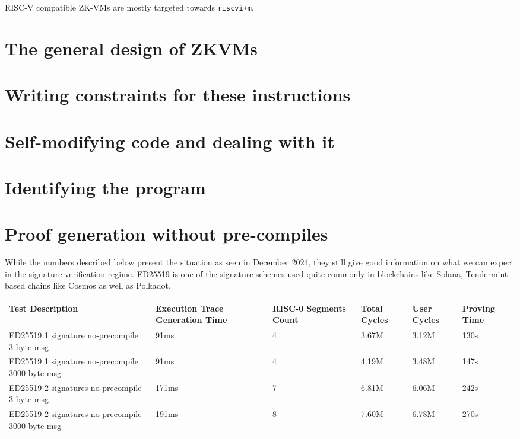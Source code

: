 RISC-V compatible ZK-VMs are mostly targeted towards \texttt{riscvi+m}.

\section{The general design of ZKVMs}

\section{Writing constraints for these instructions}

\section{Self-modifying code and dealing with it}

\section{Identifying the program}

\section{Proof generation without pre-compiles}
While the numbers described below present the situation as seen in December 2024, they still give good information on what we can expect in the signature verification regime. ED25519 is one of the signature schemes used quite commonly in blockchains like Solana, Tendermint-based chains like Cosmos as well as Polkadot.

\begin{center}
\begin{tabular}{ | m{14em} | m{5em}| m{5em} |m{5em} |m{5em} |m{4em} | } 
  \hline
  \textbf{Test Description} & \textbf{Execution Trace Generation Time} & \textbf{RISC-0 Segments Count} & \textbf{Total Cycles} & \textbf{User Cycles} & \textbf{Proving Time}\\ 
  \hline
  ED25519 1 signature no-precompile 3-byte msg  & 91ms & 4 & 3.67M & 3.12M & 130s \\ 
  \hline
  ED25519 1 signature no-precompile 3000-byte msg  & 91ms & 4 & 4.19M & 3.48M & 147s \\ 
  \hline
  ED25519 2 signatures no-precompile 3-byte msg  & 171ms & 7 & 6.81M & 6.06M & 242s \\ 
  \hline
  ED25519 2 signatures no-precompile 3000-byte msg  & 191ms & 8 & 7.60M & 6.78M & 270s \\ 
  \hline
\end{tabular}
\end{center}

